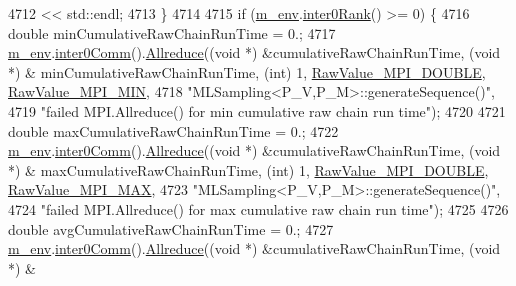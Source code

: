 \begin{DoxyCode}
{{{{4712                               << std::endl;
4713     \}
4714 
4715     \textcolor{keywordflow}{if} (\hyperlink{class_q_u_e_s_o_1_1_m_l_sampling_a13f1ca4fe9f94822fe572a743eaced1d}{m\_env}.\hyperlink{class_q_u_e_s_o_1_1_base_environment_ae106b5bb8a80b655b88b3a26b1e7c185}{inter0Rank}() >= 0) \{
4716       \textcolor{keywordtype}{double} minCumulativeRawChainRunTime = 0.;
4717       \hyperlink{class_q_u_e_s_o_1_1_m_l_sampling_a13f1ca4fe9f94822fe572a743eaced1d}{m\_env}.\hyperlink{class_q_u_e_s_o_1_1_base_environment_a689e4d140c74d495d97eb498714a4b82}{inter0Comm}().\hyperlink{class_q_u_e_s_o_1_1_mpi_comm_a72e137e60ef8060efb1ee5fc874fa4b8}{Allreduce}((\textcolor{keywordtype}{void} *) &cumulativeRawChainRunTime, (\textcolor{keywordtype}{void} *) &
      minCumulativeRawChainRunTime, (\textcolor{keywordtype}{int}) 1, \hyperlink{_mpi_comm_8h_ad0f503bd9fecfe4e570ca3d15aaf2518}{RawValue\_MPI\_DOUBLE}, 
      \hyperlink{_mpi_comm_8h_a8e30f42fdac116861205e83e2aa18042}{RawValue\_MPI\_MIN},
4718                                    \textcolor{stringliteral}{"MLSampling<P\_V,P\_M>::generateSequence()"},
4719                                    \textcolor{stringliteral}{"failed MPI.Allreduce() for min cumulative raw chain run time"});
4720 
4721       \textcolor{keywordtype}{double} maxCumulativeRawChainRunTime = 0.;
4722       \hyperlink{class_q_u_e_s_o_1_1_m_l_sampling_a13f1ca4fe9f94822fe572a743eaced1d}{m\_env}.\hyperlink{class_q_u_e_s_o_1_1_base_environment_a689e4d140c74d495d97eb498714a4b82}{inter0Comm}().\hyperlink{class_q_u_e_s_o_1_1_mpi_comm_a72e137e60ef8060efb1ee5fc874fa4b8}{Allreduce}((\textcolor{keywordtype}{void} *) &cumulativeRawChainRunTime, (\textcolor{keywordtype}{void} *) &
      maxCumulativeRawChainRunTime, (\textcolor{keywordtype}{int}) 1, \hyperlink{_mpi_comm_8h_ad0f503bd9fecfe4e570ca3d15aaf2518}{RawValue\_MPI\_DOUBLE}, 
      \hyperlink{_mpi_comm_8h_a68f3ac7ff71a6504e236b0c95de78178}{RawValue\_MPI\_MAX},
4723                                    \textcolor{stringliteral}{"MLSampling<P\_V,P\_M>::generateSequence()"},
4724                                    \textcolor{stringliteral}{"failed MPI.Allreduce() for max cumulative raw chain run time"});
4725 
4726       \textcolor{keywordtype}{double} avgCumulativeRawChainRunTime = 0.;
4727       \hyperlink{class_q_u_e_s_o_1_1_m_l_sampling_a13f1ca4fe9f94822fe572a743eaced1d}{m\_env}.\hyperlink{class_q_u_e_s_o_1_1_base_environment_a689e4d140c74d495d97eb498714a4b82}{inter0Comm}().\hyperlink{class_q_u_e_s_o_1_1_mpi_comm_a72e137e60ef8060efb1ee5fc874fa4b8}{Allreduce}((\textcolor{keywordtype}{void} *) &cumulativeRawChainRunTime, (\textcolor{keywordtype}{void} *) &
}}}}
\end{DoxyCode}
